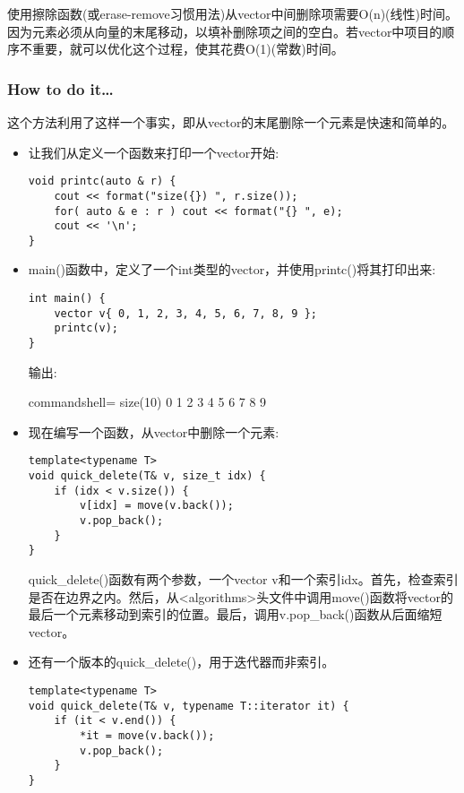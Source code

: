 
使用擦除函数(或erase-remove习惯用法)从vector中间删除项需要O(n)(线性)时间。因为元素必须从向量的末尾移动，以填补删除项之间的空白。若vector中项目的顺序不重要，就可以优化这个过程，使其花费O(1)(常数)时间。

\subsubsection{How to do it…}

这个方法利用了这样一个事实，即从vector的末尾删除一个元素是快速和简单的。

\begin{itemize}
\item 
让我们从定义一个函数来打印一个vector开始:

\begin{lstlisting}[style=styleCXX]
void printc(auto & r) {
	cout << format("size({}) ", r.size());
	for( auto & e : r ) cout << format("{} ", e);
	cout << '\n';
}
\end{lstlisting}

\item 
main()函数中，定义了一个int类型的vector，并使用printc()将其打印出来:

\begin{lstlisting}[style=styleCXX]
int main() {
	vector v{ 0, 1, 2, 3, 4, 5, 6, 7, 8, 9 };
	printc(v);
}
\end{lstlisting}

输出:

\begin{tcblisting}{commandshell={}}
size(10) 0 1 2 3 4 5 6 7 8 9
\end{tcblisting}

\item 
现在编写一个函数，从vector中删除一个元素:

\begin{lstlisting}[style=styleCXX]
template<typename T>
void quick_delete(T& v, size_t idx) {
	if (idx < v.size()) {
		v[idx] = move(v.back());
		v.pop_back();
	}
}
\end{lstlisting}

quick\_delete()函数有两个参数，一个vector v和一个索引idx。首先，检查索引是否在边界之内。然后，从<algorithms>头文件中调用move()函数将vector的最后一个元素移动到索引的位置。最后，调用v.pop\_back()函数从后面缩短vector。

\item 
还有一个版本的quick\_delete()，用于迭代器而非索引。

\begin{lstlisting}[style=styleCXX]
template<typename T>
void quick_delete(T& v, typename T::iterator it) {
	if (it < v.end()) {
		*it = move(v.back());
		v.pop_back();
	}
}
\end{lstlisting}


\end{itemize}
